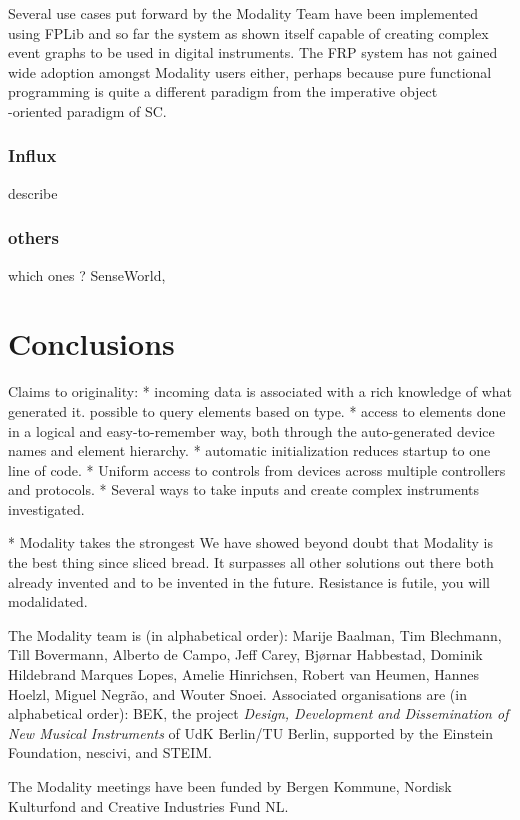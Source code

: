 \documentclass{article}
\begin{document}
Several use cases put forward by the Modality Team have been implemented using FPLib and so far the system as shown itself capable of creating complex event graphs to be used in digital instruments. The FRP system has not gained wide adoption amongst Modality users either, perhaps because pure functional programming is quite a different paradigm from the imperative object\\-oriented paradigm of SC.

\subsubsection{Influx}

describe

\subsubsection{others}

which ones ? SenseWorld, 


\section{Conclusions}
\label{sec:conclusions}


Claims to originality:
* incoming data is associated with a rich knowledge of what generated it. possible to query elements based on type.
* access to elements done in a logical and easy-to-remember way, both through the auto-generated device names and element hierarchy.
* automatic initialization reduces startup to one line of code.
* Uniform access to controls from devices across multiple controllers and protocols.
* Several ways to take inputs and create complex instruments investigated.

* Modality takes the strongest
We have showed beyond doubt that Modality is the best thing since sliced bread. It surpasses all other solutions out there both already invented and to be invented in the future. Resistance is futile, you will modalidated.


\begin{acknowledgments}
The Modality team is (in alphabetical order):
    Marije Baalman,
    Tim Blechmann,
    Till Bovermann,
    Alberto de Campo,
    Jeff Carey,
    Bj\o{}rnar Habbestad,
    Dominik Hildebrand Marques Lopes,
    Amelie Hinrichsen,
    Robert van Heumen,
    Hannes Hoelzl,
    Miguel Negr\~{a}o, and
    Wouter Snoei.
Associated organisations are (in alphabetical order):
BEK,
the project \emph{Design, Development and Dissemination of New Musical Instruments} of UdK Berlin/TU Berlin, supported by the Einstein Foundation,
nescivi, and
STEIM.

The Modality meetings have been funded by Bergen Kommune, Nordisk Kulturfond and Creative Industries Fund NL.


\end{acknowledgments} 


\end{document}
